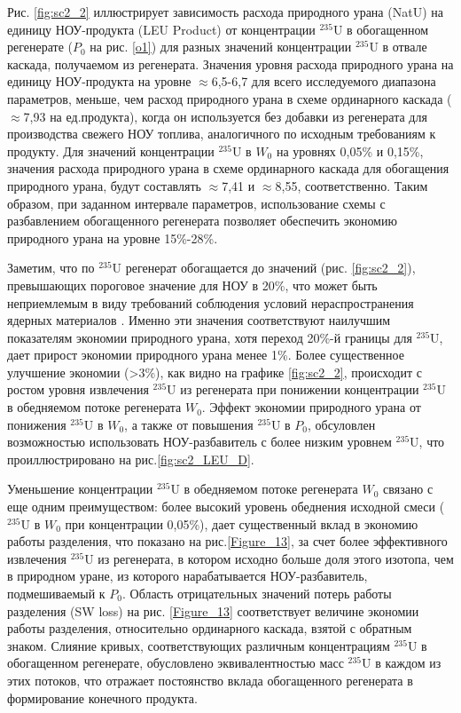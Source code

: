 Рис. \ref{fig:sc2_2} иллюстрирует зависимость расхода природного урана (NatU) на единицу НОУ-продукта (LEU Product) от концентрации $^{235}$U в обогащенном регенерате ($P_0$ на рис. \ref{o1}) для разных значений концентрации $^{235}$U в отвале каскада, получаемом из регенерата. Значения уровня расхода природного урана на единицу НОУ-продукта на уровне $\approx$6,5-6,7 для всего исследуемого диапазона параметров, меньше, чем расход природного урана в схеме ординарного каскада ($\approx$7,93 на ед.продукта), когда он используется без добавки из регенерата для производства свежего НОУ топлива, аналогичного по исходным требованиям к продукту. Для значений концентрации $^{235}$U в $W_0$ на уровнях 0,05\% и 0,15\%, значения расхода природного урана в схеме ординарного каскада для обогащения природного урана, будут составлять $\approx$7,41 и $\approx$8,55, соответственно. Таким образом, при заданном интервале параметров, использование схемы с разбавлением обогащенного регенерата позволяет обеспечить экономию природного урана на уровне 15\%-28\%.

Заметим, что по $^{235}$U регенерат обогащается до значений (рис.  \ref{fig:sc2_2}), превышающих пороговое значение для НОУ в 20\%, что может быть неприемлемым в виду требований соблюдения условий нераспространения ядерных материалов \cite{brownOriginsSignificanceLimit2016}. Именно эти значения соответствуют наилучшим показателям экономии природного урана, хотя переход 20\%-й границы для $^{235}$U, дает прирост экономии природного урана менее 1\%. Более существенное улучшение экономии (>3\%), как видно на графике \ref{fig:sc2_2}, происходит с ростом уровня извлечения $^{235}$U из регенерата при понижении концентрации $^{235}$U в обедняемом потоке регенерата $W_0$. Эффект экономии природного урана от понижения $^{235}$U в $W_0$, а также от повышения $^{235}$U в $P_0$, обсуловлен возможностью использовать НОУ-разбавитель с более низким уровнем $^{235}$U, что проиллюстрировано на рис.\ref{fig:sc2_LEU_D}.

Уменьшение концентрации $^{235}$U в обедняемом потоке регенерата $W_0$ связано с еще одним преимуществом: более высокий уровень обеднения исходной смеси ($^{235}$U в $W_0$ при концентрации 0,05\%), дает существенный вклад в экономию работы разделения, что показано на рис.\ref{Figure_13}, за счет более эффективного извлечения $^{235}$U из регенерата, в котором исходно больше доля этого изотопа, чем в природном уране, из которого нарабатывается НОУ-разбавитель, подмешиваемый к $P_0$. Область отрицательных значений потерь работы разделения (SW loss) на рис. \ref{Figure_13} соответствует величине экономии работы разделения, относительно ординарного каскада, взятой с обратным знаком. Слияние кривых, соответствующих различным концентрациям $^{235}$U в обогащенном регенерате, обусловлено эквивалентностью масс $^{235}$U в каждом из этих потоков, что отражает постоянство вклада обогащенного регенерата в формирование конечного продукта.

